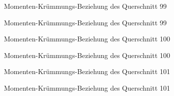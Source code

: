 \documentclass[
  11pt,
  letterpaper,
]{scrreprt}
\begin{document}
\begin{figure}[H]


\caption{\label{fig-qs_99}Momenten-Krümmungs-Beziehung des Querschnitt
99}

\end{figure}%

\begin{figure}[H]


\caption{\label{fig-m_chi_99}Momenten-Krümmungs-Beziehung des
Querschnitt 99}

\end{figure}%

\begin{figure}[H]


\caption{\label{fig-qs_100}Momenten-Krümmungs-Beziehung des Querschnitt
100}

\end{figure}%

\begin{figure}[H]


\caption{\label{fig-m_chi_100}Momenten-Krümmungs-Beziehung des
Querschnitt 100}

\end{figure}%

\begin{figure}[H]


\caption{\label{fig-qs_101}Momenten-Krümmungs-Beziehung des Querschnitt
101}

\end{figure}%

\begin{figure}[H]


\caption{\label{fig-m_chi_101}Momenten-Krümmungs-Beziehung des
Querschnitt 101}

\end{figure}%
\end{document}

